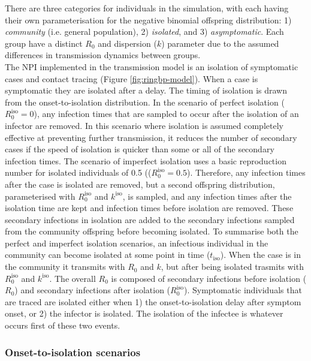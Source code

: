 \documentclass{article}
\begin{document}
There are three categories for individuals in the simulation, with each having their own parameterisation for the negative binomial offspring distribution: 1) \textit{community} (i.e. general population), 2) \textit{isolated}, and 3) \textit{asymptomatic}. Each group have a distinct $R_0$ and dispersion ($k$) parameter due to the assumed differences in transmission dynamics between groups. \\

The NPI implemented in the transmission model is an isolation of symptomatic cases and contact tracing (Figure \ref{fig:ringbp-model}). When a case is symptomatic they are isolated after a delay. The timing of isolation is drawn from the onset-to-isolation distribution. In the scenario of perfect isolation ($R_0^\mathrm{iso} = 0$), any infection times that are sampled to occur after the isolation of an infector are removed. In this scenario where isolation is assumed completely effective at preventing further transmission, it reduces the number of secondary cases if the speed of isolation is quicker than some or all of the secondary infection times. The scenario of imperfect isolation uses a basic reproduction number for isolated individuals of 0.5 (($R_0^\mathrm{iso} = 0.5$). Therefore, any infection times after the case is isolated are removed, but a second offspring distribution, parameterised with $R_0^\mathrm{iso}$ and $k^\mathrm{iso}$, is sampled, and any infection times after the isolation time are kept and infection times before isolation are removed. These secondary infections in isolation are added to the secondary infections sampled from the community offspring before becoming isolated. To summarise both the perfect and imperfect isolation scenarios, an infectious individual in the community can become isolated at some point in time ($t_\mathrm{iso}$). When the case is in the community it transmits with $R_0$ and $k$, but after being isolated trasmits with $R_0^\mathrm{iso}$ and $k^\mathrm{iso}$. The overall $R_0$ is composed of secondary infections before isolation ($R_0$) and secondary infections after isolation ($R_0^\mathrm{iso}$). Symptomatic individuals that are traced are isolated either when 1) the onset-to-isolation delay after symptom onset, or 2) the infector is isolated. The isolation of the infectee is whatever occurs first of these two events.

\subsubsection*{Onset-to-isolation scenarios}
\end{document}
